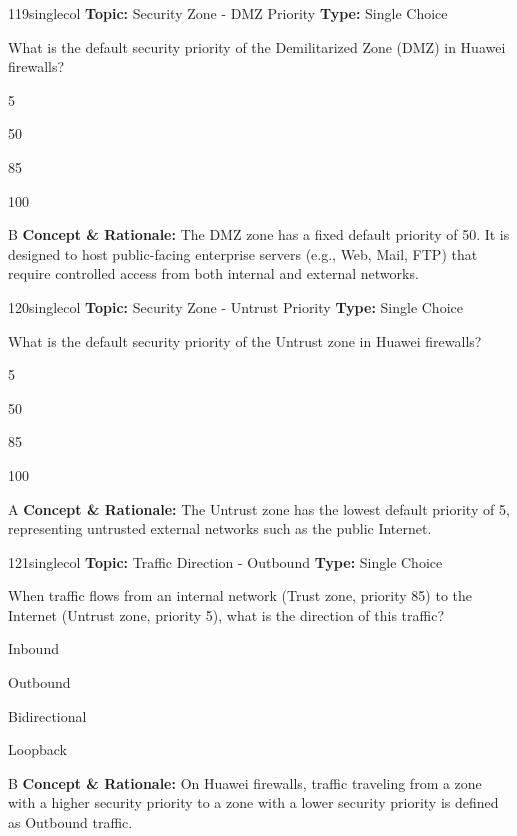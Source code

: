 \begin{qcard}{119}{singlecol}
\textcolor{darkslate!75}{\small\textbf{Topic:} Security Zone - DMZ Priority \hfill \textbf{Type:} Single Choice}\vspace{0.4em}\par
What is the default security priority of the Demilitarized Zone (DMZ) in Huawei firewalls?
\begin{qoptions}
\item 5
\item 50
\item 85
\item 100
\end{qoptions}
\end{qcard}
\nopagebreak
\begin{explainbox}{B}
\textbf{Concept \& Rationale:} The DMZ zone has a fixed default priority of 50. It is designed to host public-facing enterprise servers (e.g., Web, Mail, FTP) that require controlled access from both internal and external networks.
\end{explainbox}

\begin{qcard}{120}{singlecol}
\textcolor{darkslate!75}{\small\textbf{Topic:} Security Zone - Untrust Priority \hfill \textbf{Type:} Single Choice}\vspace{0.4em}\par
What is the default security priority of the Untrust zone in Huawei firewalls?
\begin{qoptions}
\item 5
\item 50
\item 85
\item 100
\end{qoptions}
\end{qcard}
\nopagebreak
\begin{explainbox}{A}
\textbf{Concept \& Rationale:} The Untrust zone has the lowest default priority of 5, representing untrusted external networks such as the public Internet.
\end{explainbox}

\begin{qcard}{121}{singlecol}
\textcolor{darkslate!75}{\small\textbf{Topic:} Traffic Direction - Outbound \hfill \textbf{Type:} Single Choice}\vspace{0.4em}\par
When traffic flows from an internal network (Trust zone, priority 85) to the Internet (Untrust zone, priority 5), what is the direction of this traffic?
\begin{qoptions}
\item Inbound
\item Outbound
\item Bidirectional
\item Loopback
\end{qoptions}
\end{qcard}
\nopagebreak
\begin{explainbox}{B}
\textbf{Concept \& Rationale:} On Huawei firewalls, traffic traveling from a zone with a higher security priority to a zone with a lower security priority is defined as Outbound traffic.
\end{explainbox}

